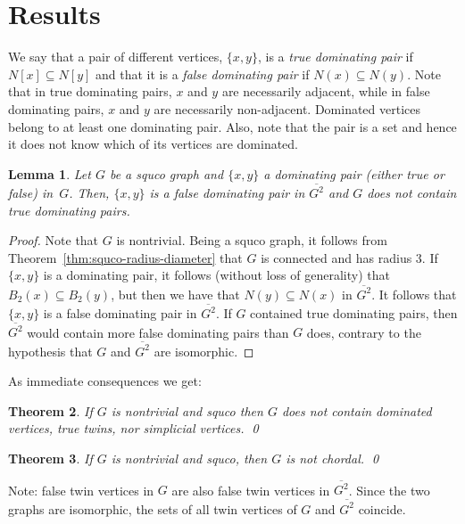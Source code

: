 \documentclass[12pt]{article}
\newtheorem{theorem}{Theorem}[section]
\newtheorem{lemma}[theorem]{Lemma}
\newcommand{\sq}[1]{\overline{#1^2}}
\begin{document}
\section{Results}

We say that a pair of different vertices, $\{x,y\}$, is a \emph{true dominating pair} if $N[x]\subseteq N[y]$ and that it is a \emph{false dominating pair} if $N(x) \subseteq N(y)$.  
Note that in true dominating pairs, $x$ and $y$ are necessarily adjacent, while in false dominating pairs, $x$ and $y$ are necessarily non-adjacent.
Dominated vertices belong to at least one dominating pair.  Also, note that the pair is a set and hence it does not know which of its vertices are dominated.

\begin{lemma}\label{lem:notruedompairs}
  Let $G$ be a squco graph and $\{x,y\}$ a dominating pair (either true or false) in~$G$.  
  Then, $\{x,y\}$ is a false dominating pair in $\sq{G}$ and $G$ does not contain true dominating pairs.
\end{lemma}

\begin{proof}
  Note that $G$ is nontrivial.  
  Being a squco graph, it follows from Theorem~\ref{thm:squco-radius-diameter} that $G$ is connected and has radius $3$.  
  If $\{x,y\}$ is a dominating pair, it follows (without loss of generality) that $B_{2}(x)\subseteq B_{2}(y)$, but
  then we have that $N(y)\subseteq N(x)$ in $\sq{G}$.  
  It follows that $\{x,y\}$ is a false dominating pair in $\sq{G}$.  
  If $G$ contained true dominating pairs, then $\sq{G}$ would contain more false dominating pairs than $G$ does, contrary to the hypothesis that $G$ and $\sq{G}$ are isomorphic.
\end{proof}

As immediate consequences we get:

\begin{theorem}\label{thm:notruetwins}
  If $G$ is nontrivial and squco then $G$ does not contain dominated vertices, true twins, nor simplicial vertices. \qed
\end{theorem}

\begin{theorem}\label{thm:nochordal}
  If $G$ is nontrivial and squco, then $G$ is not chordal. \qed
\end{theorem}

Note: false twin vertices in $G$ are also false twin vertices in $\sq{G}$.  
Since the two graphs are isomorphic, the sets of all twin vertices of $G$ and $\sq{G}$ coincide.
\end{document}
